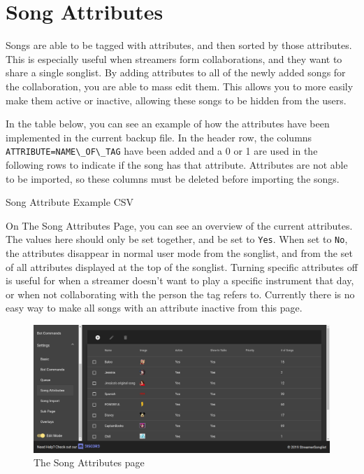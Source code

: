 
\section{Song Attributes}
Songs are able to be tagged with attributes, and then sorted by those attributes. This is especially useful when streamers form collaborations, and they want to share a single songlist. By adding attributes to all of the newly added songs for the collaboration, you are able to mass edit them. This allows you to more easily make them active or inactive, allowing these songs to be hidden from the users.

In the table below, you can see an example of how the attributes have been implemented in the current backup file. In the header row, the columns \mbox{\lstinline{ATTRIBUTE=NAME\_OF\_TAG}} have been added and a 0 or 1 are used in the following rows to indicate if the song has that attribute. Attributes are not able to be imported, so these columns must be deleted before importing the songs.


\begin{table}[h!]
\caption{Song Attribute Example CSV}
\label{song_attribute_example_table}
\end{table}

\clearpage
On The Song Attributes Page, you can see an overview of the current attributes. The values here should only be set together, and be set to \lstinline{Yes}. When set to \lstinline{No}, the attributes disappear in normal user mode from the songlist, and from the set of all attributes displayed at the top of the songlist. Turning specific attributes off is useful for when a streamer doesn't want to play a specific instrument that day, or when not collaborating with the person the tag refers to. Currently there is no easy way to make all songs with an attribute inactive from this page.

\begin{figure}[ht!]
  \includegraphics[width=\linewidth]{src/attributes/attributes.png}
  \caption{The Song Attributes page}
  \label{song_attributes_page}
\end{figure}
